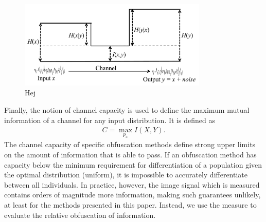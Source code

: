 \begin{figure}
	\centering
	\includegraphics[width=0.8\textwidth]{figures/theory/entropy-comp}
	\caption{Hej}\label{fig:entropy-comp}
\end{figure}






Finally, the notion of channel capacity is used to define the maximum mutual information of a channel for any input distribution. It is defined as
\begin{align}
    C = \max_{p_x} I(X, Y).
\end{align}
The channel capacity of specific obfuscation methods define strong upper limits on the amount of information that is able to pass. If an obfuscation method has capacity below the minimum requirement for differentiation of a population given the optimal distribution (uniform), it is impossible to accurately differentiate between all individuals. In practice, however, the image signal which is measured contains orders of magnitude more information, making such guarantees unlikely, at least for the methods presented in this paper. Instead, we use the measure to evaluate the relative obfuscation of information.

